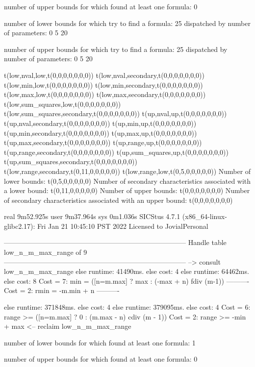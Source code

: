 number of upper bounds for which found at least one formula: 0

number of lower bounds for which try to find a formula: 25
dispatched by number of parameters: 0  5  20

number of upper bounds for which try to find a formula: 25
dispatched by number of parameters: 0  5  20

t(low,nval,low,t(0,0,0,0,0,0,0))
t(low,nval,secondary,t(0,0,0,0,0,0,0))
t(low,min,low,t(0,0,0,0,0,0,0))
t(low,min,secondary,t(0,0,0,0,0,0,0))
t(low,max,low,t(0,0,0,0,0,0,0))
t(low,max,secondary,t(0,0,0,0,0,0,0))
t(low,sum_squares,low,t(0,0,0,0,0,0,0))
t(low,sum_squares,secondary,t(0,0,0,0,0,0,0))
t(up,nval,up,t(0,0,0,0,0,0,0))
t(up,nval,secondary,t(0,0,0,0,0,0,0))
t(up,min,up,t(0,0,0,0,0,0,0))
t(up,min,secondary,t(0,0,0,0,0,0,0))
t(up,max,up,t(0,0,0,0,0,0,0))
t(up,max,secondary,t(0,0,0,0,0,0,0))
t(up,range,up,t(0,0,0,0,0,0,0))
t(up,range,secondary,t(0,0,0,0,0,0,0))
t(up,sum_squares,up,t(0,0,0,0,0,0,0))
t(up,sum_squares,secondary,t(0,0,0,0,0,0,0))
t(low,range,secondary,t(0,11,0,0,0,0,0))
t(low,range,low,t(0,5,0,0,0,0,0))
Number of lower bounds:                                             t(0,5,0,0,0,0,0)
Number of secondary characteristics associated with a lower bound:  t(0,11,0,0,0,0,0)
Number of upper bounds:                                             t(0,0,0,0,0,0,0)
Number of secondary characteristics associated with an upper bound: t(0,0,0,0,0,0,0)

real	9m52.925s
user	9m37.964s
sys	0m1.036s
SICStus 4.7.1 (x86_64-linux-glibc2.17): Fri Jan 21 10:45:10 PST 2022
Licensed to JovialPersonal


--------------------------------------------------------------------------------
Handle table low_n_m_max_range of 9
--------------------------------------------------------------------------------
--> consult low_n_m_max_range
else runtime: 41490ms. else cost: 4
else runtime: 64462ms. else cost: 8
Cost =  7:  min  = ([n=m.max] ? max : (-max + n) fdiv (m-1)) %
----------
Cost =  2:  rmin = -m.min + n
----------

else runtime: 371848ms. else cost: 4
else runtime: 379095ms. else cost: 4
Cost =  6:  range >= ([n=m.max] ? 0 : (m.max - n) cdiv (m - 1)) %
Cost =  2:  range >= -min + max
<-- reclaim low_n_m_max_range

number of lower bounds for which found at least one formula: 1

number of upper bounds for which found at least one formula: 0

